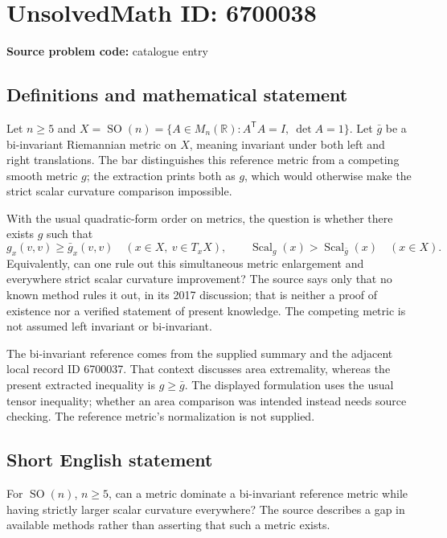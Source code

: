 \documentclass[11pt]{article}
\newcommand{\R}{\mathbb{R}}
\begin{document}
\section*{UnsolvedMath ID: 6700038}
\textbf{Source problem code:} catalogue entry
\subsection{Definitions and mathematical statement}
Let \(n\geq5\) and \(X=\operatorname{SO}(n)=\{A\in M_n(\R):A^{\mathsf T}A=I,\ \det A=1\}\). Let \(\bar g\) be a bi-invariant Riemannian metric on \(X\), meaning invariant under both left and right translations. The bar distinguishes this reference metric from a competing smooth metric \(g\); the extraction prints both as \(g\), which would otherwise make the strict scalar curvature comparison impossible.

With the usual quadratic-form order on metrics, the question is whether there exists \(g\) such that
\[
 g_x(v,v)\geq\bar g_x(v,v)\quad(x\in X,\ v\in T_xX),\qquad
 \operatorname{Scal}_g(x)>\operatorname{Scal}_{\bar g}(x)\quad(x\in X).
\]
Equivalently, can one rule out this simultaneous metric enlargement and everywhere strict scalar curvature improvement? The source says only that no known method rules it out, in its 2017 discussion; that is neither a proof of existence nor a verified statement of present knowledge. The competing metric is not assumed left invariant or bi-invariant.

The bi-invariant reference comes from the supplied summary and the adjacent local record ID 6700037. That context discusses area extremality, whereas the present extracted inequality is \(g\geq\bar g\). The displayed formulation uses the usual tensor inequality; whether an area comparison was intended instead needs source checking. The reference metric's normalization is not supplied.
\subsection{Short English statement}
For \(\operatorname{SO}(n)\), \(n\geq5\), can a metric dominate a bi-invariant reference metric while having strictly larger scalar curvature everywhere? The source describes a gap in available methods rather than asserting that such a metric exists.
\end{document}
